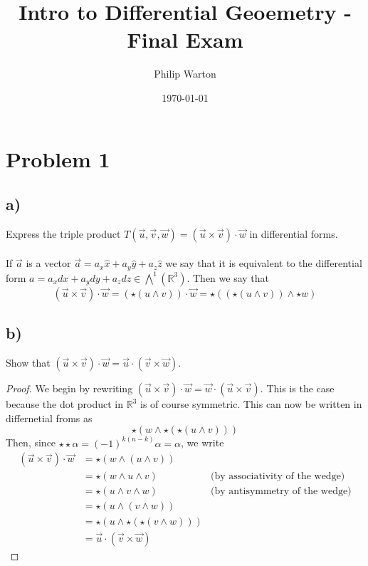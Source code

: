 \documentclass{article}
\theoremstyle{definition}
\begin{document}
\title{Intro to Differential Geoemetry - Final Exam}
\author{Philip Warton}
\date{\today}
\maketitle
\section*{Problem 1}
\subsection*{a)}
Express the triple product $T(\vec{u},\vec{v},\vec{w}) = (\vec{u} \times \vec{v}) \cdot \vec{w}$ in differential forms.
\\\\
If $\vec{a}$ is a vector $\vec{a} = a_x \hat x + a_y \hat y + a_z \hat z$ we say that it is 
equivalent to the differential form $a = a_x dx + a_y dy + a_z dz \in \bigwedge^1 (\mathbb{R}^3)$.
Then we say that 
\[
(\vec u \times \vec v) \cdot \vec w = (\star (u \wedge v)) \cdot \vec w = \star((\star(u \wedge v)) \wedge \star w)
\]
\subsection*{b)}
Show that $(\vec u \times \vec v) \cdot \vec w = \vec u \cdot (\vec v \times \vec w)$.
\begin{proof}
    We begin by rewriting $(\vec u \times \vec v) \cdot \vec w = \vec w \cdot (\vec u \times \vec v)$.
    This is the case because the dot product in $\mathbb{R}^3$ is of course symmetric. This can now be written 
    in differnetial froms as 
    \[
        \star ( w \wedge \star ( \star (u \wedge v)))
    \]
    Then, since $\star \star \alpha = (-1)^{k(n-k)} \alpha = \alpha$, we write 
    \begin{align*}
        (\vec u \times \vec v) \cdot \vec w &= \star ( w \wedge (u \wedge v))\\
        &=\star ( w \wedge u \wedge v) & \text{(by associativity of the wedge)}\\
        &=\star (u \wedge v \wedge w) & \text{(by antisymmetry of the wedge)}\\
        &= \star(u \wedge (v \wedge w))\\
        &= \star(u \wedge \star(\star(v \wedge w)))\\
        &= \vec u \cdot (\vec v \times \vec w)
    \end{align*}
\end{proof}
\end{document}
